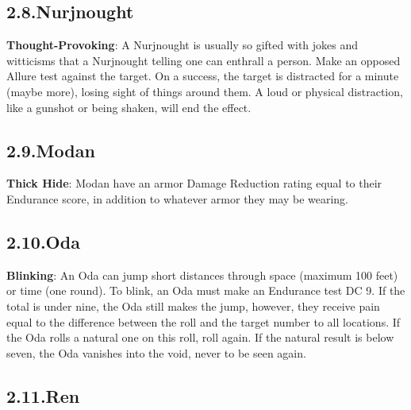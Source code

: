 \documentclass{article}
\begin{document}
\subsection{2.8.\hspace*{0.5em}Nurjnought}\label{sec-nurjnought}%

\noindent{}\textbf{Thought-Provoking}: A Nurjnought is usually so gifted with jokes and witticisms that a Nurjnought telling one can enthrall a person. Make an opposed Allure test against the target. On a success, the target is distracted for a minute (maybe more), losing sight of things around them. A loud or physical distraction, like a gunshot or being shaken, will end the effect.%

\subsection{2.9.\hspace*{0.5em}Modan}\label{sec-modan}%

\noindent{}\textbf{Thick Hide}: Modan have an armor Damage Reduction rating equal to their Endurance score, in addition to whatever armor they may be wearing.%

\subsection{2.10.\hspace*{0.5em}Oda}\label{sec-oda}%

\noindent{}\textbf{Blinking}: An Oda can jump short distances through space (maximum 100 feet) or time (one round). To blink, an Oda must make an Endurance test DC 9. If the total is under nine, the Oda still makes the jump, however, they receive pain equal to the difference between the roll and the target number to all locations. If the Oda rolls a natural one on this roll, roll again. If the natural result is below seven, the Oda vanishes into the void, never to be seen again.%

\subsection{2.11.\hspace*{0.5em}Ren}\label{sec-ren}%
\end{document}
